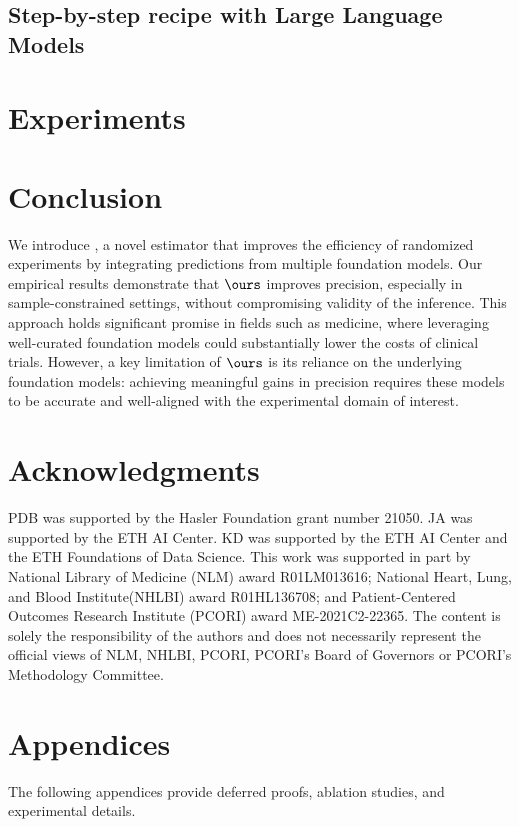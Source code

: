\documentclass{article}
\newcommand\DoToC{%
  \startcontents
\hypersetup{colorlinks=true, linkcolor=pierCite}
  \printcontents{}{1}{\subsection*{\textbf{Table of contents}}}
  \vskip3pt\vskip5pt
}
\begin{document}
\subsection{Step-by-step recipe with Large Language Models}



\section{Experiments}



\section{Conclusion}
We introduce \ours, a novel estimator that improves the efficiency of randomized experiments by integrating predictions from multiple foundation models. Our empirical results demonstrate that $\ours$ improves precision, especially in sample-constrained settings, without compromising validity of the inference. This approach holds significant promise in fields such as medicine, where leveraging well-curated foundation models could substantially lower the costs of clinical trials. However, a key limitation of $\ours$ is its reliance on the  underlying foundation models: achieving meaningful gains in precision requires these models to be accurate and well-aligned with the experimental domain of interest.

\section{Acknowledgments}
PDB was supported by the Hasler Foundation grant number 21050. JA was supported by the ETH AI
Center. KD was supported by the ETH AI Center and the ETH Foundations of Data Science.
This work was supported in part by National Library of Medicine (NLM) award R01LM013616; National Heart, Lung, and Blood Institute(NHLBI) award R01HL136708; and Patient-Centered Outcomes Research Institute (PCORI) award ME-2021C2-22365. The content is solely the responsibility of the authors and does not necessarily represent the official views of NLM, NHLBI, PCORI, PCORI’s Board of Governors or PCORI’s Methodology Committee.





\newpage 
\section*{Appendices}
The following appendices provide deferred proofs, ablation studies, and experimental details.

\appendix
\DoToC
\clearpage

\end{document}
